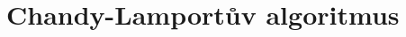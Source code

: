 \documentclass[usenames,dvipsnames,9pt]{beamer}
\begin{document}
%
%
%
%
%
%

\section{Chandy-Lamportův algoritmus}
\end{document}
